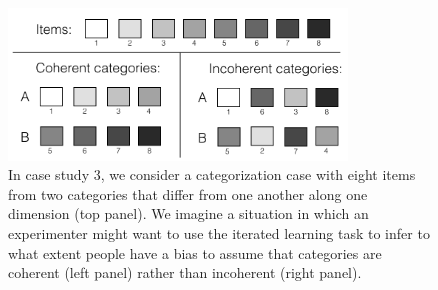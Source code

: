 \documentclass[doc]{apa6}
\begin{document}
\begin{figure}[t]
\begin{center}
\includegraphics[width=9cm]{categorisation.png} %
\caption{{\small In case study 3, we consider a categorization case with eight items from two categories that differ from one another along one dimension (top panel). We imagine a situation in which an experimenter might want to use the iterated learning task to infer to what extent people have a bias to assume that categories are coherent (left panel) rather than incoherent (right panel).}} 
\label{categories}
\end{center}
\end{figure}
\end{document}
